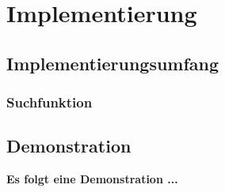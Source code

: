 \section{Implementierung}
\subsection{Implementierungsumfang}
\begin{frame} 
  \frametitle{Suchfunktion} 
  
\end{frame}


\subsection{Demonstration}
\begin{frame}
  \textbf{Es folgt eine Demonstration ...}
\end{frame}
